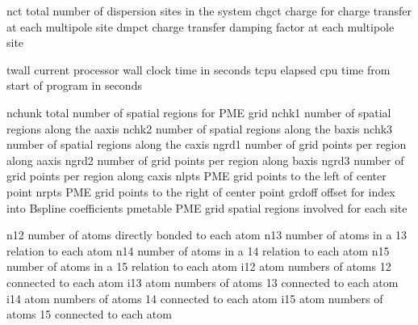 \documentclass[letterpaper,11pt,english]{sphinxmanual}
\begin{document}
\sphinxAtStartPar
{}

\begin{sphinxVerbatim}[commandchars=\\\{\}]
nct             total number of dispersion sites in the system
chgct           charge for charge transfer at each multipole site
dmpct           charge transfer damping factor at each multipole site
\end{sphinxVerbatim}

\sphinxAtStartPar
{}

\begin{sphinxVerbatim}[commandchars=\\\{\}]
twall           current processor wall clock time in seconds
tcpu            elapsed cpu time from start of program in seconds
\end{sphinxVerbatim}

\sphinxAtStartPar
{}

\begin{sphinxVerbatim}[commandchars=\\\{\}]
nchunk          total number of spatial regions for PME grid
nchk1           number of spatial regions along the a\PYGZhy{}axis
nchk2           number of spatial regions along the b\PYGZhy{}axis
nchk3           number of spatial regions along the c\PYGZhy{}axis
ngrd1           number of grid points per region along a\PYGZhy{}axis
ngrd2           number of grid points per region along b\PYGZhy{}axis
ngrd3           number of grid points per region along c\PYGZhy{}axis
nlpts           PME grid points to the left of center point
nrpts           PME grid points to the right of center point
grdoff          offset for index into B\PYGZhy{}spline coefficients
pmetable        PME grid spatial regions involved for each site
\end{sphinxVerbatim}

\sphinxAtStartPar
{}

\begin{sphinxVerbatim}[commandchars=\\\{\}]
n12             number of atoms directly bonded to each atom
n13             number of atoms in a 1\PYGZhy{}3 relation to each atom
n14             number of atoms in a 1\PYGZhy{}4 relation to each atom
n15             number of atoms in a 1\PYGZhy{}5 relation to each atom
i12             atom numbers of atoms 1\PYGZhy{}2 connected to each atom
i13             atom numbers of atoms 1\PYGZhy{}3 connected to each atom
i14             atom numbers of atoms 1\PYGZhy{}4 connected to each atom
i15             atom numbers of atoms 1\PYGZhy{}5 connected to each atom
\end{sphinxVerbatim}
\end{document}
